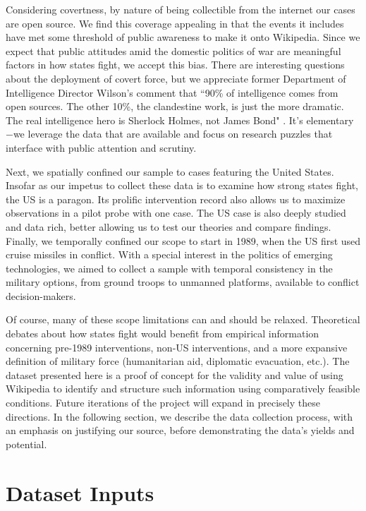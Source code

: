 \documentclass[fleqn,12pt]{article}
\begin{document}
Considering covertness, by nature of being collectible from the internet our cases are open source. We find this coverage appealing in that the events it includes have met some threshold of public awareness to make it onto Wikipedia. Since we expect that public attitudes amid the domestic politics of war are meaningful factors in how states fight, we accept this bias. There are interesting questions about the deployment of covert force, but we appreciate former Department of Intelligence Director Wilson's comment that ``90\% of intelligence comes from open sources. The other 10\%, the clandestine work, is just the more dramatic. The real intelligence hero is Sherlock Holmes, not James Bond" \citep{lands_publiclyavailableinformation_2019}. It's elementary$-$we leverage the data that are available and focus on research puzzles that interface with public attention and scrutiny.

Next, we spatially confined our sample to cases featuring the United States. Insofar as our impetus to collect these data is to examine how strong states fight, the US is a paragon. Its prolific intervention record also allows us to maximize observations in a pilot probe with one case. The US case is also deeply studied and data rich, better allowing us to test our theories and compare findings. Finally, we temporally confined our scope to start in 1989, when the US first used cruise missiles in conflict. With a special interest in the politics of emerging technologies, we aimed to collect a sample with temporal consistency in the military options, from ground troops to unmanned platforms, available to conflict decision-makers.

Of course, many of these scope limitations can and should be relaxed. Theoretical debates about how states fight would benefit from empirical information concerning pre-1989 interventions, non-US interventions, and a more expansive definition of military force (humanitarian aid, diplomatic evacuation, etc.). The dataset presented here is a proof of concept for the validity and value of using Wikipedia to identify and structure such information using comparatively feasible conditions. Future iterations of the project will expand in precisely these directions. In the following section, we describe the data collection process, with an emphasis on justifying our source, before demonstrating the data's yields and potential.

\section*{Dataset Inputs}
\end{document}
